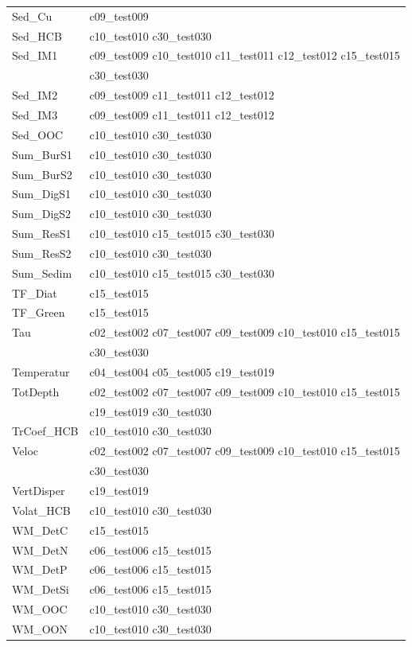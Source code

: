 \begin{longtable}{ll}
Sed\_Cu & c09\_test009 \\
Sed\_HCB & c10\_test010 c30\_test030 \\
Sed\_IM1 & c09\_test009 c10\_test010 c11\_test011 c12\_test012 c15\_test015 \\ 
 & c30\_test030 \\
Sed\_IM2 & c09\_test009 c11\_test011 c12\_test012 \\
Sed\_IM3 & c09\_test009 c11\_test011 c12\_test012 \\
Sed\_OOC & c10\_test010 c30\_test030 \\
Sum\_BurS1 & c10\_test010 c30\_test030 \\
Sum\_BurS2 & c10\_test010 c30\_test030 \\
Sum\_DigS1 & c10\_test010 c30\_test030 \\
Sum\_DigS2 & c10\_test010 c30\_test030 \\
Sum\_ResS1 & c10\_test010 c15\_test015 c30\_test030 \\
Sum\_ResS2 & c10\_test010 c30\_test030 \\
Sum\_Sedim & c10\_test010 c15\_test015 c30\_test030 \\
TF\_Diat & c15\_test015 \\
TF\_Green & c15\_test015 \\
Tau & c02\_test002 c07\_test007 c09\_test009 c10\_test010 c15\_test015 \\ 
 & c30\_test030 \\
Temperatur & c04\_test004 c05\_test005 c19\_test019 \\
TotDepth & c02\_test002 c07\_test007 c09\_test009 c10\_test010 c15\_test015 \\ 
 & c19\_test019 c30\_test030 \\
TrCoef\_HCB & c10\_test010 c30\_test030 \\
Veloc & c02\_test002 c07\_test007 c09\_test009 c10\_test010 c15\_test015 \\ 
 & c30\_test030 \\
VertDisper & c19\_test019 \\
Volat\_HCB & c10\_test010 c30\_test030 \\
WM\_DetC & c15\_test015 \\
WM\_DetN & c06\_test006 c15\_test015 \\
WM\_DetP & c06\_test006 c15\_test015 \\
WM\_DetSi & c06\_test006 c15\_test015 \\
WM\_OOC & c10\_test010 c30\_test030 \\
WM\_OON & c10\_test010 c30\_test030 \\

\end{longtable}
